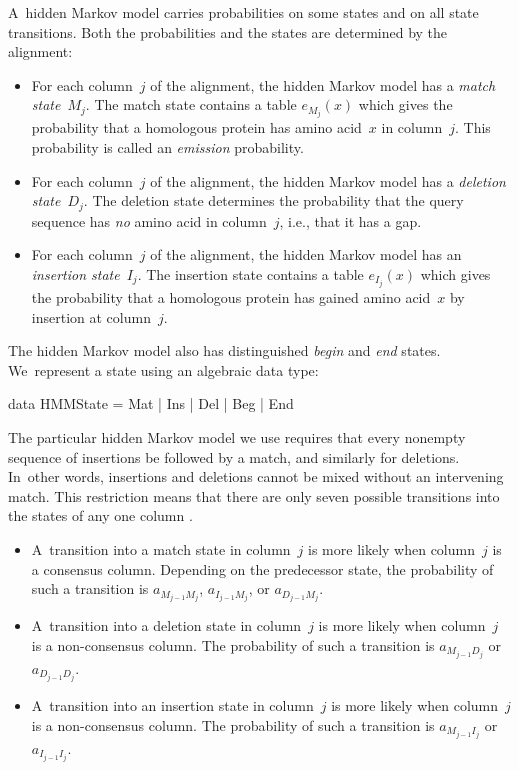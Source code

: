 \documentclass[preprint,nonatbib,blockstyle,nocopyrightspace,times]{sigplanconf}
\newcommand\txprobj[3][]{a#1_{#2_{j-1}#3_j}}
\newcommand\txprobjj[3][]{a#1_{#2_{j-1}#3_j}}
\newenvironment{smallverbatim}{\par\small\verbatim}{\endverbatim}
\let\cite\citep
\begin{document}
A~hidden Markov model carries probabilities on some states and on all
state transitions.
Both the probabilities and the states are determined by the alignment:
\begin{itemize}
\item
For each column~$j$ of the alignment, the hidden Markov model has a
\emph{match state}~$M_j$.
The match state contains a table $e_{M_j}(x)$ which gives the
 probability that a homologous protein has amino acid~$x$ in
 column~$j$.
This probability is called an \emph{emission} probability.
\item
For each column~$j$ of the alignment, the hidden Markov model has a
\emph{deletion state}~$D_j$.
The deletion state determines the probability that the query sequence
has \emph{no} amino acid  in column~$j$, i.e., that it has a gap.
\item 
For each column~$j$ of the alignment, the hidden Markov model has an
\emph{insertion state}~$I_j$.
The insertion state contains a table $e_{I_j}(x)$ which gives the
probability that a homologous protein has gained amino acid~$x$ by
insertion at column~$j$.
\end{itemize}
The hidden Markov model also has distinguished \emph{begin} and \emph{end} states.
We~represent a state using an algebraic data type:
\begin{smallverbatim}
data HMMState = Mat | Ins | Del | Beg | End
\end{smallverbatim}


The particular hidden Markov model we use requires that every nonempty
sequence of insertions be followed by a match, and similarly for
deletions.
In~other words, insertions and deletions cannot be mixed without an
intervening match.
This restriction means that there are only seven possible transitions
into the states of any one column \cite{Eddy:1998ut}. 
\begin{itemize} 
\item
A~transition into a match state in
column~$j$ is more likely when column~$j$ is a consensus column.
Depending on the predecessor state, 
the probability of such a transition is 
$\txprobj M M$, $\txprobj I M$, or $\txprobj D M$.
\item
A~transition into a deletion state in
 column~$j$ is more likely when column~$j$ is a non-consensus column.
The probability of such a transition is 
$\txprobj M D$ or $\txprobj D D$.
\item
A~transition into an insertion state in
 column~$j$ is more likely when column~$j$ is a non-consensus column.
The probability of such a transition is 
$\txprobjj M I$ or $\txprobjj I I$.
\end{itemize}
\end{document}
